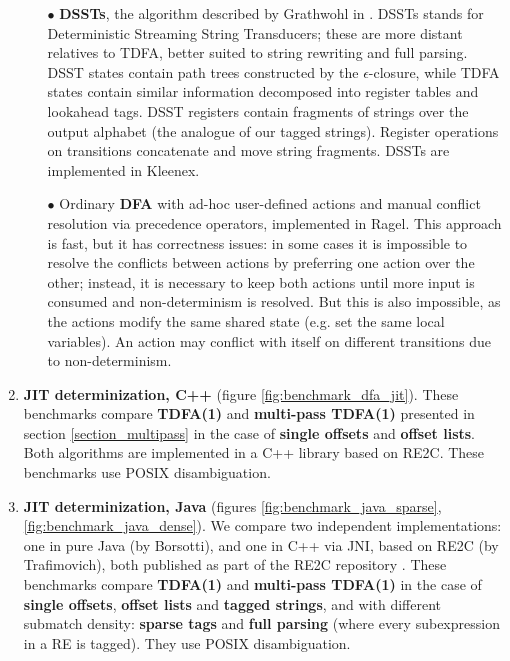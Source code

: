 \documentclass[]{article}
\begin{document}
\begin{enumerate}
\begin{itemize}
\item[$\bullet$]
\textbf{DSSTs}, the algorithm described by Grathwohl in \cite{Gra15}.
DSSTs stands for Deterministic Streaming String Transducers; these are more distant relatives to TDFA,
better suited to string rewriting and full parsing.
DSST states contain path trees constructed by the $\epsilon$-closure,
while TDFA states contain similar information decomposed into register tables and lookahead tags.
DSST registers contain fragments of strings over the output alphabet (the analogue of our tagged strings).
Register operations on transitions concatenate and move string fragments.
DSSTs are implemented in Kleenex.
\medskip

\item[$\bullet$]
Ordinary \textbf{DFA} with ad-hoc user-defined actions
and manual conflict resolution via precedence operators,
implemented in Ragel.
This approach is fast, but it has correctness issues:
in some cases it is impossible to resolve the conflicts between actions by preferring one action over the other;
instead, it is necessary to keep both actions until more input is consumed and non-determinism is resolved.
But this is also impossible, as the actions modify the same shared state (e.g. set the same local variables).
An action may conflict with itself on different transitions due to non-determinism.
\medskip

\end{itemize}

\item
\textbf{JIT determinization, C++}
(figure \ref{fig:benchmark_dfa_jit}).
These benchmarks compare \textbf{TDFA(1)} and \textbf{multi-pass TDFA(1)} presented in section \ref{section_multipass}
in the case of \textbf{single offsets} and \textbf{offset lists}.
Both algorithms are implemented in a C++ library based on RE2C.
These benchmarks use POSIX disambiguation.
\medskip

\item
\textbf{JIT determinization, Java}
(figures \ref{fig:benchmark_java_sparse}, \ref{fig:benchmark_java_dense}).
We compare two independent implementations:
one in pure Java (by Borsotti),
and one in C++ via JNI, based on RE2C (by Trafimovich),
both published as part of the RE2C repository \cite{RE2CJava}.
These benchmarks compare \textbf{TDFA(1)} and \textbf{multi-pass TDFA(1)}
in the case of \textbf{single offsets}, \textbf{offset lists} and \textbf{tagged strings},
and with different submatch density: \textbf{sparse tags} and \textbf{full parsing}
(where every subexpression in a RE is tagged).
They use POSIX disambiguation.
\medskip

\end{enumerate}
\end{document}
